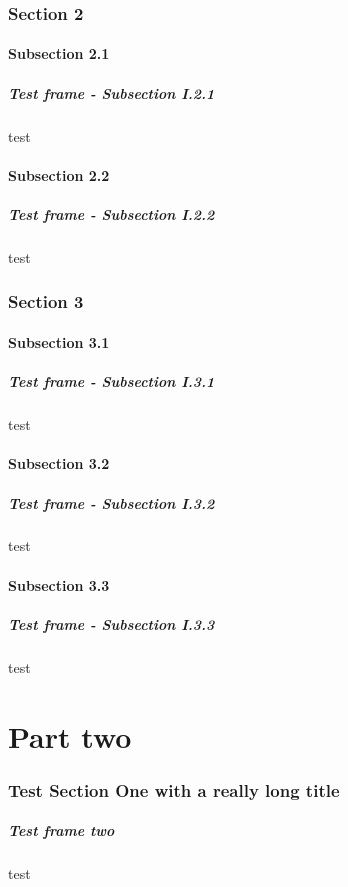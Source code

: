 \documentclass[10pt,compress]{beamer}
\begin{document}
\section{Section 2}
\subsection{Subsection 2.1}
\begin{frame}\frametitle{Test frame - Subsection I.2.1}test\end{frame}
\subsection{Subsection 2.2}
\begin{frame}\frametitle{Test frame - Subsection I.2.2}test\end{frame}

\section{Section 3}
\subsection{Subsection 3.1}
\begin{frame}\frametitle{Test frame - Subsection I.3.1}test\end{frame}
\subsection{Subsection 3.2}
\begin{frame}\frametitle{Test frame - Subsection I.3.2}test\end{frame}
\subsection{Subsection 3.3}
\begin{frame}\frametitle{Test frame - Subsection I.3.3}test\end{frame}

\part{Part two}

\section[Section 1]{Test Section One with a really long title}
\begin{frame}\frametitle{Test frame two}test\end{frame}
\end{document}
